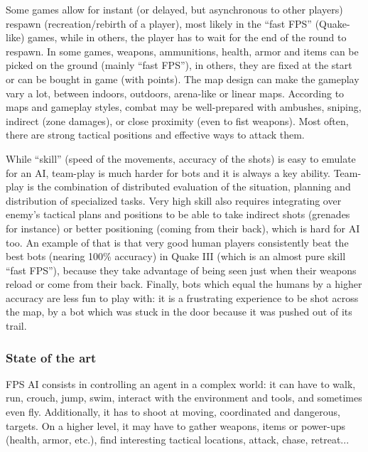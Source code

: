Some games allow for instant (or delayed, but asynchronous to other players) respawn (recreation/rebirth of a player), most likely in the ``fast FPS'' (Quake-like) games, while in others, the player has to wait for the end of the round to respawn. In some games, weapons, ammunitions, health, armor and items can be picked on the ground (mainly ``fast FPS''), in others, they are fixed at the start or can be bought in game (with points). The map design can make the gameplay vary a lot, between indoors, outdoors, arena-like or linear maps. According to maps and gameplay styles, combat may be well-prepared with ambushes, sniping, indirect (zone damages), or close proximity (even to fist weapons). Most often, there are strong tactical positions and effective ways to attack them. 

While ``skill'' (speed of the movements, accuracy of the shots) is easy to emulate for an AI, team-play is much harder for bots and it is always a key ability. Team-play is the combination of distributed evaluation of the situation, planning and distribution of specialized tasks. Very high skill also requires integrating over enemy's tactical plans and positions to be able to take indirect shots (grenades for instance) or better positioning (coming from their back), which is hard for AI too. An example of that is that very good human players consistently beat the best bots (nearing 100\% accuracy) in Quake III (which is an almost pure skill ``fast FPS''), because they take advantage of being seen just when their weapons reload or come from their back. Finally, bots which equal the humans by a higher accuracy are less fun to play with: it is a frustrating experience to be shot across the map, by a bot which was stuck in the door because it was pushed out of its trail.

\subsubsection{State of the art}

FPS AI consists in controlling an agent in a complex world: it can have to walk, run, crouch, jump, swim, interact with the environment and tools, and sometimes even fly. Additionally, it has to shoot at moving, coordinated and dangerous, targets. %
On a higher level, it may have to gather weapons, items or power-ups (health, armor, etc.), find interesting tactical locations, attack, chase, retreat...

